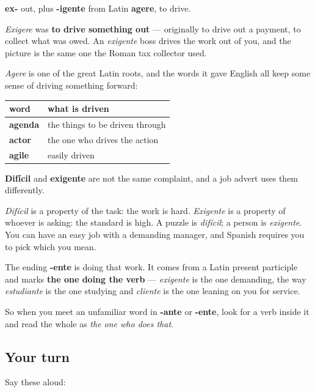 \begin{cousinweb}
\textbf{ex-} out, plus \textbf{-igente} from Latin \textbf{agere}, to drive.

\emph{Exigere} was \textbf{to drive something out} — originally to drive out a payment, to collect what was owed. An \emph{exigente} boss drives the work out of you, and the picture is the same one the Roman tax collector used.

\emph{Agere} is one of the great Latin roots, and the words it gave English all keep some sense of driving something forward:

\noindent
\begin{tabularx}{\linewidth}{@{}>{\raggedright\arraybackslash}X>{\raggedright\arraybackslash}X@{}}
\toprule
\textbf{word} & \textbf{what is driven} \\
\midrule
\textbf{agenda} & the things to be driven through \\
\textbf{actor} & the one who drives the action \\
\textbf{agile} & easily driven \\
\bottomrule
\end{tabularx}
\end{cousinweb}

\begin{culture}
\textbf{Difícil} and \textbf{exigente} are not the same complaint, and a job advert uses them differently.

\emph{Difícil} is a property of the task: the work is hard. \emph{Exigente} is a property of whoever is asking: the standard is high. A puzzle is \emph{difícil}; a person is \emph{exigente}. You can have an easy job with a demanding manager, and Spanish requires you to pick which you mean.

The ending \textbf{-ente} is doing that work. It comes from a Latin present participle and marks \textbf{the one doing the verb} — \emph{exigente} is the one demanding, the way \emph{estudiante} is the one studying and \emph{cliente} is the one leaning on you for service.

So when you meet an unfamiliar word in \textbf{-ante} or \textbf{-ente}, look for a verb inside it and read the whole as \emph{the one who does that}.
\end{culture}

\subsection*{Your turn}
Say these aloud:

